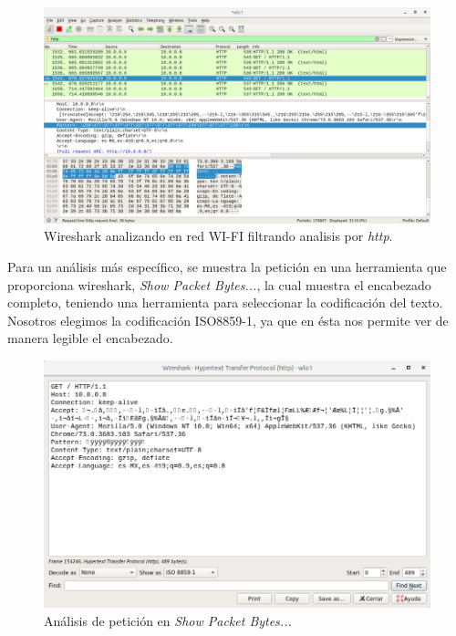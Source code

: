 \documentclass[12pt, a4paper, titlepage]{report}
\begin{document}
            \begin{figure}[H]
        		\begin{center}	\includegraphics[width=13cm]{./imagenes/Pruebas/Prototipo_2/wiresharkFull.jpeg}
        			\caption{Wireshark analizando en red WI-FI filtrando analisis por \textit{http}.}
        		\end{center}
        	\end{figure}
	
        	Para un análisis más específico, se muestra la petición en una herramienta que proporciona wireshark, \textit{Show Packet Bytes...}, la cual muestra el encabezado completo, teniendo una herramienta para seleccionar la codificación del texto. Nosotros elegimos la codificación ISO8859-1, ya que en ésta nos permite ver de manera legible el encabezado.
	
        	\begin{figure}[H]
        		\begin{center}	\includegraphics[width=13cm]{./imagenes/Pruebas/Prototipo_2/wiresharkFrame_ISO_header.jpeg}
        			\caption{Análisis de petición en \textit{Show Packet Bytes...}}
        		\end{center}
        	\end{figure}
	\newpage
\end{document}
